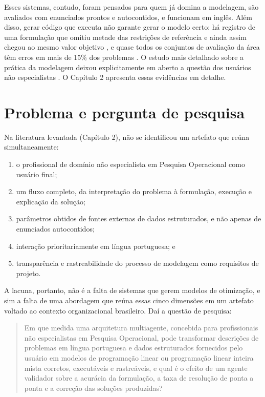 Esses sistemas, contudo, foram pensados para quem já domina a modelagem, são avaliados com enunciados prontos e autocontidos, e funcionam em inglês. Além disso, gerar código que executa não garante gerar o modelo certo: há registro de uma formulação que omitiu metade das restrições de referência e ainda assim chegou ao mesmo valor objetivo \cite{refai2025}, e quase todos os conjuntos de avaliação da área têm erros em mais de 15\% dos problemas \cite{xiao2025}. O estudo mais detalhado sobre a prática da modelagem deixou explicitamente em aberto a questão dos usuários não especialistas \cite{lawless2025}. O Capítulo 2 apresenta essas evidências em detalhe.

\section{Problema e pergunta de pesquisa}
\label{sec:problema-pesquisa}

Na literatura levantada (Capítulo 2), não se identificou um artefato que reúna simultaneamente:

\begin{enumerate}
  \item o profissional de domínio não especialista em Pesquisa Operacional como usuário final;
  \item um fluxo completo, da interpretação do problema à formulação, execução e explicação da solução;
  \item parâmetros obtidos de fontes externas de dados estruturados, e não apenas de enunciados autocontidos;
  \item interação prioritariamente em língua portuguesa; e
  \item transparência e rastreabilidade do processo de modelagem como requisitos de projeto.
\end{enumerate}

A lacuna, portanto, não é a falta de sistemas que gerem modelos de otimização, e sim a falta de uma abordagem que reúna essas cinco dimensões em um artefato voltado ao contexto organizacional brasileiro. Daí a questão de pesquisa:

\begin{quote}
  Em que medida uma arquitetura multiagente, concebida para profissionais não especialistas em Pesquisa Operacional, pode transformar descrições de problemas em língua portuguesa e dados estruturados fornecidos pelo usuário em modelos de programação linear ou programação linear inteira mista corretos, executáveis e rastreáveis, e qual é o efeito de um agente validador sobre a acurácia da formulação, a taxa de resolução de ponta a ponta e a correção das soluções produzidas?
\end{quote}

